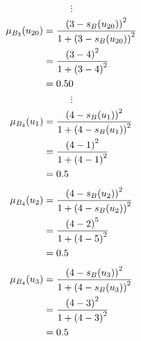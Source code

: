 \documentclass[a4paper]{book}
\begin{document}
				\[
					\vdots
				\]
				\begin{align}
					\mu_{B_3}(u_{20}) &= \frac{\left(3-s_B(u_{20})\right)^2}{1 + \left(3-s_B(u_{20})\right)^2}\\
					&= \frac{\left(3-4\right)^2}{1 + \left(3-4\right)^2} \notag \\
					&= 0.50 \notag
				\end{align}
				\[
					\vdots
				\]
				\begin{align}
					\mu_{B_4}(u_1) &= \frac{\left(4-s_B(u_1)\right)^2}{1 + \left(4-s_B(u_1)\right)^2}\\
					&= \frac{\left(4-1\right)^2}{1 + \left(4-1\right)^2} \notag \\
					&= 0.5 \notag
				\end{align}
				\begin{align}
					\mu_{B_4}(u_2) &= \frac{\left(4-s_B(u_2)\right)^2}{1 + \left(4-s_B(u_2)\right)^2}\\
					&= \frac{\left(4-2\right)^5}{1 + \left(4-5\right)^2} \notag \\
					&= 0.5 \notag
				\end{align}
				\begin{align}
					\mu_{B_4}(u_3) &= \frac{\left(4-s_B(u_3)\right)^2}{1 + \left(4-s_B(u_3)\right)^2}\\
					&= \frac{\left(4-3\right)^2}{1 + \left(4-3\right)^2} \notag \\
					&= 0.5 \notag
				\end{align}
\end{document}
